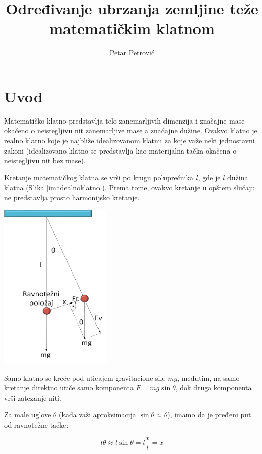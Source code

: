 \documentclass[a4paper]{article}
\title{Određivanje ubrzanja zemljine teže matematičkim klatnom}
\author{Petar Petrović}
\begin{document}
\maketitle

\section{Uvod}

Matematičko klatno predstavlja telo zanemarljivih dimenzija i značajne mase okačeno o neistegljivu nit zanemarljive mase a značajne dužine. Ovakvo klatno je realno klatno koje je najbliže idealizovanom klatnu za koje važe neki jednostavni zakoni (idealizovano klatno se predstavlja kao materijalna tačka okačena o neistegljivu nit bez mase).
\par
Kretanje matematičkog klatna se vrši po krugu poluprečnika $l$, gde je $l$ dužina klatna (Slika \ref{im:idealnoklatno}). Prema tome, ovakvo kretanje u opštem slučaju ne predstavlja prosto harmonijsko kretanje.

\begin{center}
    \label{im:idealnoklatno}
    \includegraphics[height=8cm,keepaspectratio]{mat_klatno.png}
\end{center}

Samo klatno se kreće pod uticajem gravitacione sile $mg$, međutim, na samo kretanje direktno utiče samo komponenta $F = mg \sin \theta$, dok druga komponenta vrši zatezanje niti.
\par
Za male uglove $\theta$ (kada važi aproksimacija $\sin \theta \approx \theta$), imamo da je pređeni put od ravnotežne tačke:

\begin{equation}
    \label{eq:aproksimacija}
    l\theta \approx l \sin \theta = l \frac{x}{l} = x
\end{equation}
\end{document}
